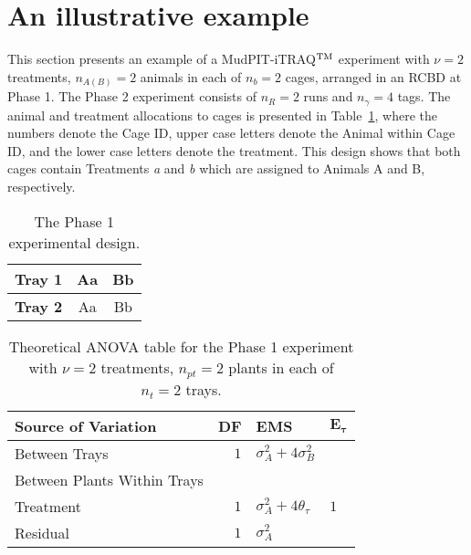 \section{An illustrative example}
\label{sec:RCBDexp}
This section presents an example of a MudPIT-iTRAQ$^{\rm TM}$ experiment with $\nu = 2$ treatments, $n_{A(B)} = 2$ animals in each of $n_b = 2$ cages, arranged in an RCBD at Phase 1. The Phase 2 experiment consists of $n_R = 2$ runs and $n_\gamma = 4$ tags. The animal and treatment allocations to cages is presented in Table~\ref{tab:Phase1DesEx}, where the numbers denote the Cage ID, upper case letters denote the Animal within Cage ID, and the lower case letters denote the treatment. This design shows that both cages contain Treatments \textit{a} and \textit{b} which are assigned to Animals A and B, respectively. 

\begin{table}[ht]
\centering
\caption{The Phase 1 experimental design.}
\begin{tabular}[t]{|c|cc|} \hline
{\bf Tray 1} & Aa & Bb  \\ \hline
{\bf Tray 2} &Aa & Bb \\  \hline
\end{tabular} 
\label{tab:Phase1DesEx}
\end{table}

\begin{table}[h]
\centering
 \caption{Theoretical ANOVA table for the Phase 1 experiment with $\nu = 2$ treatments, $n_{pt} =2$ plants in each of $n_t = 2$ trays.}
 \begin{tabular}[t]{lrll} 
 \toprule 
 \multicolumn{1}{l}{\textbf{Source of Variation}} & \multicolumn{1}{l}{\textbf{DF}} & \multicolumn{1}{l}{\textbf{EMS}}& \multicolumn{1}{l}{$\bm{E_{\tau}}$}\\ 
 \midrule 
 Between Trays & $1$ & $\sigma_{A}^2+4\sigma_{B}^2$ &\\ \hline 
 Between Plants Within Trays &  &  &\\ 
 \quad Treatment & $1$ & $\sigma_{A}^2+4\theta_{\tau}$ &$1$\\ 
 \quad Residual & $1$ & $\sigma_{A}^2$ &\\ 
 \bottomrule 
 \end{tabular} 
 \label{tab:Phase1ANOVAEx} 
\end{table} 

